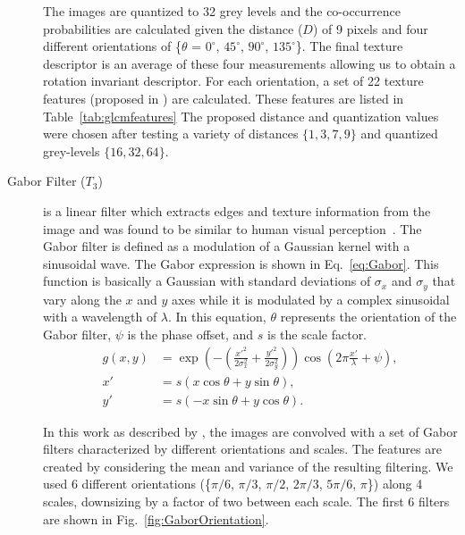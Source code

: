 \begin{description}
The images are quantized to 32 grey levels and the co-occurrence probabilities are calculated given the distance ($D$) of 9 pixels and four different orientations of \{$\theta$ = $0^{\circ}$, $45^{\circ}$, $90^{\circ}$, $135^{\circ}$\}.
The final texture descriptor is an average of these four measurements allowing us to obtain a rotation invariant descriptor.
For each orientation, a set of 22 texture features (proposed in \cite{haralick1973textural, clausi2002analysis, soh1999texture}) are calculated.
These features are listed in Table~\ref{tab:glcmfeatures}
The proposed distance and quantization values were chosen after testing a variety of distances $\{1, 3, 7, 9\}$ and quantized grey-levels $\{16, 32, 64\}$.

\item[Gabor Filter ($T_{3}$)] is a linear filter which extracts edges and texture information from the image and was found to be similar to human visual perception~\cite{marvcelja1980mathematical}.
	The Gabor filter is defined as a modulation of a Gaussian kernel with a sinusoidal wave.
	The Gabor expression is shown in Eq.~\ref{eq:Gabor}.
	This function is basically a Gaussian with standard deviations of $\sigma_{x}$ and $\sigma_{y}$ that vary along the $x$ and $y$ axes while it is modulated by a complex sinusoidal with a wavelength of $\lambda$.
	In this equation, $\theta$ represents the orientation of the Gabor filter, $\psi$ is the phase offset, and $s$ is the scale factor.	
	\begin{subequations}
	\begin{align}
	g(x,y) & = \exp \left(-\left(\frac{x'^2}{2\sigma_{x}^{2}}+\frac{y'^{2}}{2\sigma_{y}^{2}}\right)\right) \cos\left(2\pi\frac{x'}{\lambda}+ \psi\right), \\
	x'& = s(x\cos\theta + y\sin\theta),\\
	y' &= s(-x\sin\theta + y\cos\theta).	
	\end{align}
	\label{eq:Gabor}
	\end{subequations}
	
In this work as described by \cite{Manjunath96-45}, the images are convolved with a set of Gabor filters characterized by different orientations and scales.
The features are created by considering the mean and variance of the resulting filtering.
We used 6 different orientations (\{$\pi/6$, $\pi/3$, $\pi/2$, $2\pi/3$, $5\pi/6$, $\pi$\}) along 4 scales, downsizing by a factor of two between each scale.
The first 6 filters are shown in Fig.~\ref{fig:GaborOrientation}.


\end{description}

